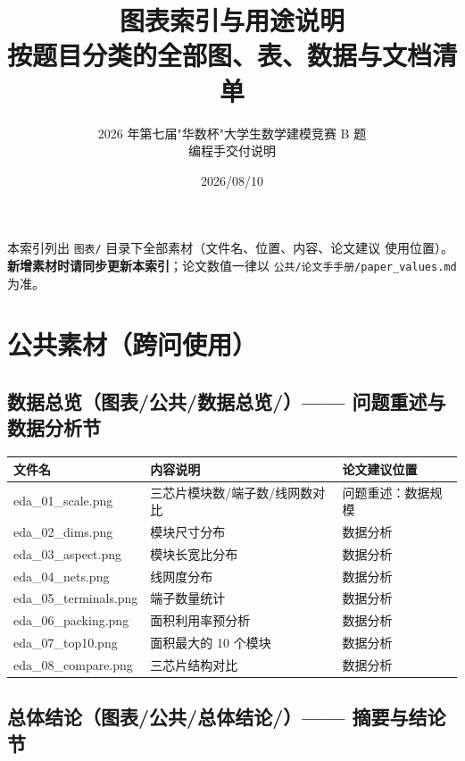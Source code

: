 \documentclass[12pt,a4paper]{article}
\title{\textbf{图表索引与用途说明}\\[6pt]
\large 按题目分类的全部图、表、数据与文档清单}
\author{2026 年第七届"华数杯"大学生数学建模竞赛 B 题 \\ 编程手交付说明}
\date{2026/08/10}
\begin{document}
\maketitle

本索引列出 \texttt{图表/} 目录下全部素材（文件名、位置、内容、论文建议
使用位置）。\textbf{新增素材时请同步更新本索引}；论文数值一律以
\texttt{公共/论文手手册/paper\_values.md} 为准。

\section{公共素材（跨问使用）}

\subsection{数据总览（图表/公共/数据总览/）—— 问题重述与数据分析节}

\begin{table}[H]
\centering
\scriptsize
\setlength{\tabcolsep}{1.5pt}
\begin{tabular}{>{\raggedright\arraybackslash}p{4.4cm}>{\raggedright\arraybackslash}p{7.6cm}>{\raggedright\arraybackslash}p{3.4cm}}
\toprule
文件名 & 内容说明 & 论文建议位置 \\
\midrule
eda\_\allowbreak{}01\_\allowbreak{}scale.png & 三芯片模块数/端子数/线网数对比 & 问题重述：数据规模 \\
eda\_\allowbreak{}02\_\allowbreak{}dims.png & 模块尺寸分布 & 数据分析 \\
eda\_\allowbreak{}03\_\allowbreak{}aspect.png & 模块长宽比分布 & 数据分析 \\
eda\_\allowbreak{}04\_\allowbreak{}nets.png & 线网度分布 & 数据分析 \\
eda\_\allowbreak{}05\_\allowbreak{}terminals.png & 端子数量统计 & 数据分析 \\
eda\_\allowbreak{}06\_\allowbreak{}packing.png & 面积利用率预分析 & 数据分析 \\
eda\_\allowbreak{}07\_\allowbreak{}top10.png & 面积最大的 10 个模块 & 数据分析 \\
eda\_\allowbreak{}08\_\allowbreak{}compare.png & 三芯片结构对比 & 数据分析 \\
\bottomrule
\end{tabular}
\end{table}

\subsection{总体结论（图表/公共/总体结论/）—— 摘要与结论节}
\end{document}
